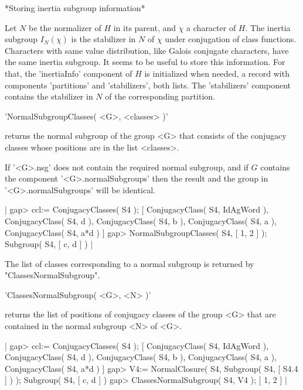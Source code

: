 \vspace{3mm}

*Storing inertia subgroup information*

Let $N$ be the normalizer of $H$ in its parent, and $\chi$ a character
of $H$.  The inertia subgroup $I_N(\chi)$ is the stabilizer
in $N$ of $\chi$ under conjugation of class functions.  Characters with
same value distribution, like Galois conjugate characters, have the
same inertia subgroup.  It seems to be useful to store this information.
For that, the 'inertiaInfo' component of $H$ is initialized when needed,
a record with components 'partitions' and 'stabilizers', both lists.
The 'stabilizers' component contains the stabilizer in $N$ of the
corresponding partition.


'NormalSubgroupClasses( <G>, <classes> )'

returns the normal subgroup of the group <G> that consists of the
conjugacy classes whose positions are in the list <classes>.

If '<G>.nsg' does not contain the required normal subgroup, and if $G$
contains the component '<G>.normalSubgroups' then the result and the
group in '<G>.normalSubgroups' will be identical.

|    gap> ccl:= ConjugacyClasses( S4 );
    [ ConjugacyClass( S4, IdAgWord ), ConjugacyClass( S4, d ), 
      ConjugacyClass( S4, b ), ConjugacyClass( S4, a ), 
      ConjugacyClass( S4, a*d ) ]
    gap> NormalSubgroupClasses( S4, [ 1, 2 ] );
    Subgroup( S4, [ c, d ] ) |

The list of classes corresponding to a normal subgroup is returned by
"ClassesNormalSubgroup".
    

'ClassesNormalSubgroup( <G>, <N> )'

returns the list of positions of conjugacy classes of the group <G> that
are contained in the normal subgroup <N> of <G>.

|    gap> ccl:= ConjugacyClasses( S4 );
    [ ConjugacyClass( S4, IdAgWord ), ConjugacyClass( S4, d ), 
      ConjugacyClass( S4, b ), ConjugacyClass( S4, a ), 
      ConjugacyClass( S4, a*d ) ]
    gap> V4:= NormalClosure( S4, Subgroup( S4, [ S4.4 ] ) );
    Subgroup( S4, [ c, d ] )
    gap> ClassesNormalSubgroup( S4, V4 );
    [ 1, 2 ] |
    
